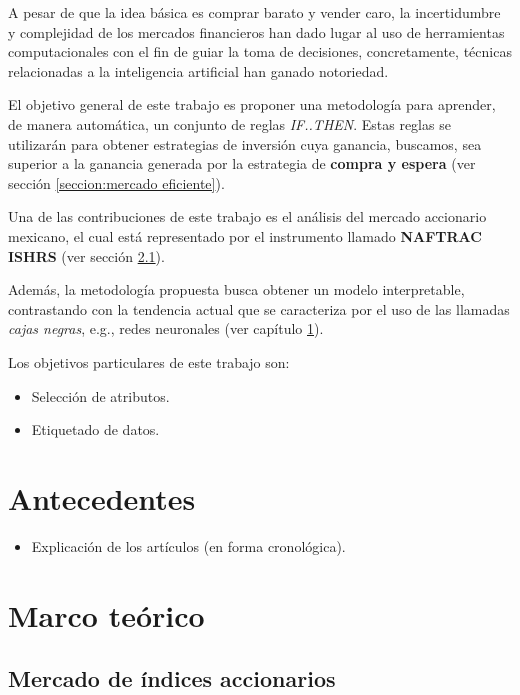 \documentclass[12pt]{scrbook}
\theoremstyle{break}
\theoremstyle{break}
\begin{document}
A pesar de que la idea básica es comprar barato y vender caro, la incertidumbre y complejidad de los mercados financieros han dado lugar al uso de herramientas computacionales con el fin de guiar la toma de decisiones, concretamente, técnicas relacionadas a la inteligencia artificial han ganado notoriedad.

El objetivo general de este trabajo es proponer una metodología para aprender, de manera automática, un conjunto de reglas \textit{IF..THEN}. Estas reglas se utilizarán para obtener estrategias de inversión cuya ganancia, buscamos, sea superior a la ganancia generada por la estrategia de \textbf{compra y espera} (ver sección \ref{seccion:mercado eficiente}).

Una de las contribuciones de este trabajo es el análisis del mercado accionario mexicano, el cual está representado por el instrumento llamado \textbf{NAFTRAC ISHRS} (ver sección \ref{seccion:indices accionarios}).

Además, la metodología propuesta busca obtener un modelo interpretable, contrastando con la tendencia actual que se caracteriza por el uso de las llamadas \textit{cajas negras}, e.g., redes neuronales (ver capítulo \ref{capitulo:antecedentes}).

Los objetivos particulares de este trabajo son:
\begin{itemize}
\item Selección de atributos.

\item Etiquetado de datos.
\end{itemize}




\chapter{Antecedentes}
\label{capitulo:antecedentes}
\begin{itemize}
\item Explicación de los artículos (en forma cronológica).
\end{itemize}

\chapter{Marco teórico}
\label{capitulo:marco teorico}

\section{Mercado de índices accionarios}
\label{seccion:indices accionarios}
\end{document}
